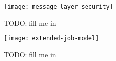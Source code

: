 \begin{figure}
  \begin{center}
    \texttt{[image: message-layer-security]}
  \end{center}
  \caption[Message Layer Security]{TODO: fill me in}
  \label{fig:net-mls}
\end{figure}

\begin{figure}
  \begin{center}
    \texttt{[image: extended-job-model]}
  \end{center}
  \caption[Job Model (extended)]{TODO: fill me in}
  \label{fig:bes-extended-xen}
\end{figure}

